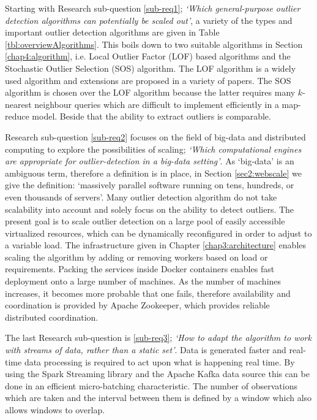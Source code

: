 Starting with Research sub-question \ref{sub-req1}; \emph{`Which general-purpose outlier detection algorithms can potentially be scaled out'}, a variety of the types and important outlier detection algorithms are given in Table \ref{tbl:overviewAlgorithms}. This boils down to two suitable algorithms in Section \ref{chap4:algorithm}, i.e. Local Outlier Factor (LOF) based algorithms and the Stochastic Outlier Selection (SOS) algorithm. The LOF algorithm is a widely used algorithm and extensions are proposed in a variety of papers. The SOS algorithm is chosen over the LOF algorithm because the latter requires many $k$-nearest neighbour queries which are difficult to implement efficiently in a map-reduce model. Beside that the ability to extract outliers is comparable.

Research sub-question \ref{sub-req2} focuses on the field of big-data and distributed computing to explore the possibilities of scaling; \emph{`Which computational engines are appropriate for outlier-detection in a big-data setting'}. As `big-data' is an ambiguous term, therefore a definition is in place, in Section \ref{sec2:webscale} we give the definition: `massively parallel software running on tens, hundreds, or even thousands of servers'. Many outlier detection algorithm do not take scalability into account and solely focus on the ability to detect outliers. The present goal is to scale outlier detection on a large pool of easily accessible virtualized resources, which can be dynamically reconfigured in order to adjust to a variable load. The infrastructure given in Chapter \ref{chap3:architecture} enables scaling the algorithm by adding or removing workers based on load or requirements. Packing the services inside Docker containers enables fast deployment onto a large number of machines. As the number of machines increases, it becomes more probable that one fails, therefore availability and coordination is provided by Apache Zookeeper, which provides reliable distributed coordination.

The last Research sub-question is \ref{sub-req3}; \emph{`How to adapt the algorithm to work with streams of data, rather than a static set'}. Data is generated faster and real-time data processing is required to act upon what is happening real time. By using the Spark Streaming library and the Apache Kafka data source this can be done in an efficient micro-batching characteristic. The number of observations which are taken and the interval between them is defined by a window which also allows windows to overlap.

